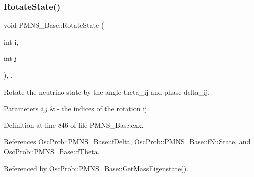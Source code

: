\mbox{\label{classOscProb_1_1PMNS__Base_ae52554477ad3250daa5adb8c32cab0b4}} 
\subsubsection{\texorpdfstring{Rotate\+State()}{RotateState()}}
{\footnotesize\ttfamily void P\+M\+N\+S\+\_\+\+Base\+::\+Rotate\+State (\begin{DoxyParamCaption}\item[{int}]{i,  }\item[{int}]{j }\end{DoxyParamCaption})\hspace{0.3cm}{\ttfamily [protected]}, {\ttfamily [virtual]}, {\ttfamily [inherited]}}

Rotate the neutrino state by the angle theta\+\_\+ij and phase delta\+\_\+ij.


\begin{DoxyParams}{Parameters}
{\em i,j} & -\/ the indices of the rotation ij \\
\hline
\end{DoxyParams}


Definition at line 846 of file P\+M\+N\+S\+\_\+\+Base.\+cxx.



References Osc\+Prob\+::\+P\+M\+N\+S\+\_\+\+Base\+::f\+Delta, Osc\+Prob\+::\+P\+M\+N\+S\+\_\+\+Base\+::f\+Nu\+State, and Osc\+Prob\+::\+P\+M\+N\+S\+\_\+\+Base\+::f\+Theta.



Referenced by Osc\+Prob\+::\+P\+M\+N\+S\+\_\+\+Base\+::\+Get\+Mass\+Eigenstate().


